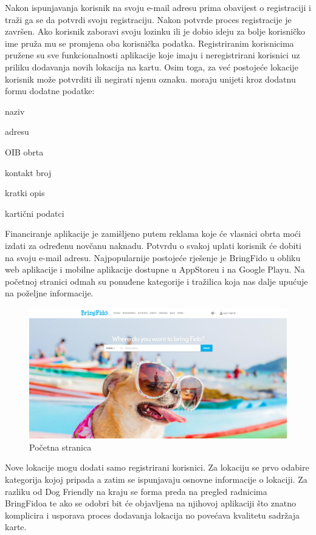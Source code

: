 Nakon ispunjavanja korisnik na svoju e-mail adresu prima obavijest o registraciji i traži ga se da potvrdi svoju registraciju. Nakon potvrde proces registracije je završen. Ako korisnik zaboravi svoju lozinku ili je dobio ideju za bolje korisničko ime pruža mu se promjena oba korisnička podatka. Registriranim korisnicima pružene su sve funkcionalnosti aplikacije koje imaju i neregistrirani korisnici uz priliku dodavanja novih lokacija na kartu. Osim toga, za već postojeće lokacije korisnik može potvrditi ili negirati njenu oznaku. 
\newline  {} moraju unijeti kroz dodatnu formu dodatne podatke:
\begin{packed_item}
	
	\item  naziv
	\item  adresu
	\item  OIB obrta
	\item  kontakt broj
	\item  kratki opis
	\item  kartični podatci
\end{packed_item} Financiranje aplikacije je zamišljeno putem reklama koje će vlasnici obrta moći izdati za određenu novčanu naknadu. Potvrdu o svakoj uplati korisnik će dobiti na svoju e-mail adresu.
\newline  Najpopularnije postojeće rješenje je BringFido u obliku web aplikacije i mobilne aplikacije dostupne u AppStoreu i na Google Playu. Na početnoj stranici odmah su ponuđene kategorije i tražilica koja nas dalje upućuje na poželjne informacije.
\begin{figure}[H]
	\includegraphics[scale=0.3]{slike/FidoHome.png} 
	\centering
	\caption{Početna stranica}
	\label{fig:promjene}
\end{figure}
Nove lokacije mogu dodati samo registrirani korisnici. Za lokaciju se prvo odabire kategorija kojoj pripada a zatim se ispunjavaju osnovne informacije o lokaciji. Za razliku od Dog Friendly na kraju se forma preda na pregled radnicima BringFidoa te ako se odobri bit će objavljena na njihovoj aplikaciji što znatno komplicira i usporava proces dodavanja lokacija no povećava kvalitetu sadržaja karte.
